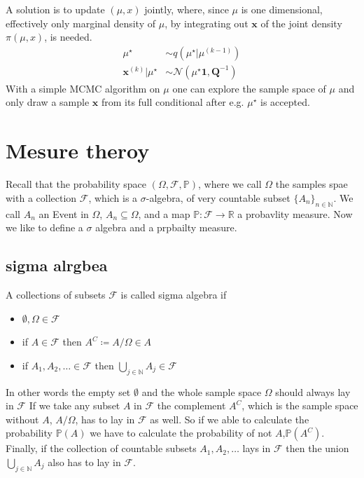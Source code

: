 A solution is to update $(\mu, x)$ jointly, where, since $\mu$ is one dimensional, effectively only marginal density of $\mu$, by integrating out $\bm{x}$  of the joint density $\pi(\mu, x)$, is needed.
\begin{align}
	\mu^{\star}  &\sim q (\mu^{\star}|	\mu^{(k-1)} ) \\
	\bm{x}^{(k)} | \mu^{\star} &\sim \mathcal{N} (	\mu^{\star}\bm{1}, \bm{Q}^{-1}) 
\end{align}
With a simple MCMC algorithm on $ \mu$ one can explore the sample space of $\mu$ and only draw a sample $\bm{x}$ from its full conditional after e.g.  $\mu^{\star}$ is accepted. 



\chapter{Mesure theroy}
\label{ap:Correlatation}
Recall that the probability space $(\Omega, \mathcal{F} , \mathbb{P})$, where we call $\Omega$ the samples spae with a collection $\mathcal{F}$, which is a $\sigma $-algebra, of very countable subset $\{ A _n \}_{n\in \mathbb{N}}$.
We call $A_n$ an Event in $\Omega$, $A_n \subseteq  \Omega$, and a map $\mathbb{P} : \mathcal{F} \longrightarrow \mathbb{R}$ a probavlity measure.
Now we like to define a $\sigma$ algebra and a prpbailty measure.
\section{sigma alrgbea}
A collections of subsets $\mathcal{F}$ is called sigma algebra if
\begin{itemize}
	\item $\emptyset, \Omega \in \mathcal{F} $
	\item if $A \in \mathcal{F} $ then $A^C \coloneqq A / \Omega \in A$
	\item if $A_1 , A_2, \dots  \in \mathcal{F} $ then $ \bigcup_{j \in \mathbb{N}}  A_j \in  \mathcal{F}$
\end{itemize}
In other words the empty set $\emptyset$ and the whole sample space $ \Omega$ should always lay in $\mathcal{F}$ 
If we take any subset $A$ in $\mathcal{F}$ the complement  $A^C $, which is the sample space without $A$, $A / \Omega$, has to lay in $\mathcal{F}$ as well.
So if we able to calculate the probability $\mathbb{P}(A)$ we have to calculate the probability of not $A$,$ \mathbb{P}(A^C)$.
Finally, if the collection of countable subsets $A_1 , A_2, \dots $ lays in $\mathcal{F}$ then the union $\bigcup_{j \in \mathbb{N}}  A_j$ also has to lay in $\mathcal{F}$.

